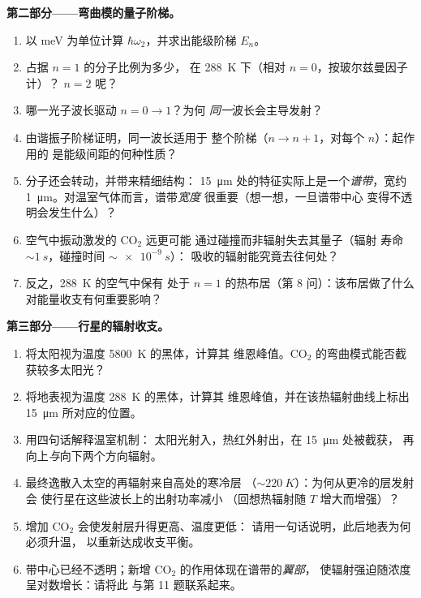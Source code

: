 \begin{problem}
\medskip\noindent\textbf{第二部分——弯曲模的量子阶梯。}
\begin{enumerate}[resume]
  \item 以 meV 为单位计算 $\hbar\omega_2$，并求出能级阶梯 $E_n$。
  \item 占据 $n = 1$ 的分子比例为多少，
        在 \qty{288}{K} 下（相对 $n = 0$，按玻尔兹曼因子计）？
        $n = 2$ 呢？
  \item 哪一光子波长驱动 $n = 0 \to 1$？为何
        \emph{同一}波长会主导发射？
  \item 由谐振子阶梯证明，同一波长适用于
        整个阶梯（$n \to n + 1$，对每个 $n$）：起作用的
        是能级间距的何种性质？
  \item 分子还会转动，并带来精细结构：
        \qty{15}{\micro m} 处的特征实际上是一个\emph{谱带}，宽约
        \qty{1}{\micro m}。对温室气体而言，谱带\emph{宽度}
        很重要（想一想，一旦谱带中心
        变得不透明会发生什么）？
  \item 空气中振动激发的 CO$_2$ 远更可能
        通过碰撞而非辐射失去其量子（辐射
        寿命 $\sim\qty{1}{s}$，碰撞时间 $\sim\qty{e-9}{s}$）：
        吸收的辐射能究竟去往何处？
  \item 反之，\qty{288}{K} 的空气中保有
        处于 $n = 1$ 的热布居（第 8 问）：该布居做了什么
        对能量收支有何重要影响？
\end{enumerate}

\medskip\noindent\textbf{第三部分——行星的辐射收支。}
\begin{enumerate}[resume]
  \item 将太阳视为温度 \qty{5800}{K} 的黑体，计算其
        维恩峰值。CO$_2$ 的弯曲模式能否截获较多太阳光？
  \item 将地表视为温度 \qty{288}{K} 的黑体，计算其
        维恩峰值，并在该热辐射曲线上标出 \qty{15}{\micro m}
        所对应的位置。
  \item 用四句话解释温室机制：
        太阳光射入，热红外射出，在 \qty{15}{\micro m} 处被截获，
        再向上\emph{与}向下两个方向辐射。
  \item 最终逸散入太空的再辐射来自高处的寒冷层
        （$\sim\qty{220}{K}$）：为何从更冷的层发射会
        使行星在这些波长上的出射功率减小
        （回想热辐射随 $T$ 增大而增强）？
  \item 增加 CO$_2$ 会使发射层升得更高、温度更低：
        请用一句话说明，此后地表为何必须升温，
        以重新达成收支平衡。
  \item 带中心已经不透明；新增
        CO$_2$ 的作用体现在谱带的\emph{翼部}，
        使辐射强迫随浓度呈对数增长：请将此
        与第 11 题联系起来。
\end{enumerate}


\end{problem}
